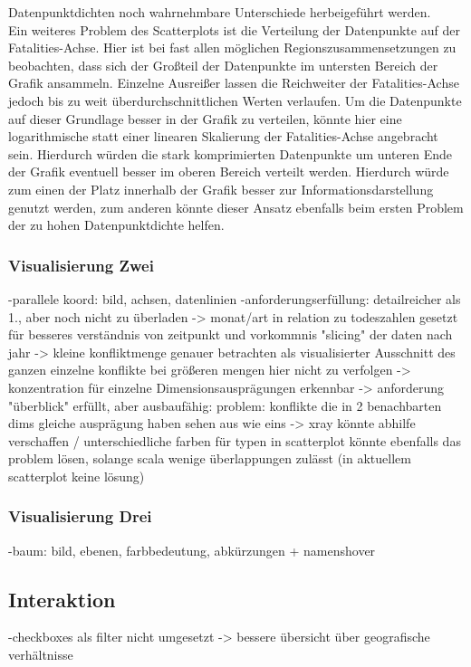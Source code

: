 \documentclass[usegeometry=true]{scrartcl}
\begin{document}
Datenpunktdichten noch wahrnehmbare Unterschiede herbeigeführt werden.\\ Ein weiteres Problem des Scatterplots ist die Verteilung der Datenpunkte auf der Fatalities-Achse. Hier ist bei fast allen möglichen Regionszusammensetzungen zu beobachten, dass sich der Großteil der Datenpunkte im untersten Bereich der Grafik ansammeln. Einzelne Ausreißer lassen die Reichweiter der Fatalities-Achse jedoch bis zu weit überdurchschnittlichen Werten verlaufen. Um die Datenpunkte auf dieser Grundlage besser in der Grafik zu verteilen, könnte hier eine logarithmische statt einer linearen Skalierung der Fatalities-Achse angebracht sein. Hierdurch würden die stark komprimierten Datenpunkte um unteren Ende der Grafik eventuell besser im oberen Bereich verteilt werden. Hierdurch würde zum einen der Platz innerhalb der Grafik besser zur Informationsdarstellung genutzt werden, zum anderen könnte dieser Ansatz ebenfalls beim ersten Problem der zu hohen Datenpunktdichte helfen.\\

\subsubsection{Visualisierung Zwei}
-parallele koord: bild, achsen, datenlinien
-anforderungserfüllung: detailreicher als 1., aber noch nicht zu überladen ->
	monat/art in relation zu todeszahlen gesetzt für besseres verständnis von zeitpunkt und vorkommnis
	"slicing" der daten nach jahr -> kleine konfliktmenge genauer betrachten als visualisierter Ausschnitt des ganzen
	einzelne konflikte bei größeren mengen hier nicht zu verfolgen -> konzentration für einzelne Dimensionsausprägungen erkennbar -> anforderung "überblick" erfüllt, aber ausbaufähig: problem: konflikte die in 2 benachbarten dims gleiche ausprägung haben sehen aus wie eins -> xray könnte abhilfe verschaffen / unterschiedliche farben für typen in scatterplot könnte ebenfalls das problem lösen, solange scala wenige überlappungen zulässt (in aktuellem scatterplot keine lösung)

\subsubsection{Visualisierung Drei}
-baum: bild, ebenen, farbbedeutung, abkürzungen + namenshover

\subsection{Interaktion}
-checkboxes als filter nicht umgesetzt -> bessere übersicht über geografische verhältnisse
\end{document}
